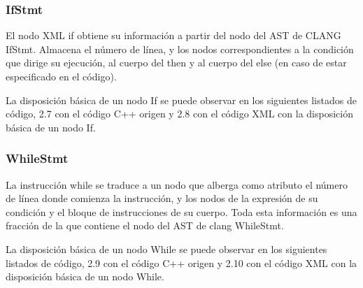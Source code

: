 \subsubsection*{IfStmt}

El nodo XML if obtiene su informaci\'on a partir del nodo del AST de CLANG IfStmt. Almacena el n\'umero de l\'inea, y los nodos correspondientes a la condici\'on que dirige su ejecuci\'on, al cuerpo del then y al cuerpo del else (en caso de estar especificado en el c\'odigo).

La disposici\'on b\'asica de un nodo If se puede observar en los siguientes listados de c\'odigo, 2.7 con el c\'odigo C++ origen y 2.8 con el c\'odigo XML con la disposici\'on b\'asica de un nodo If.




\subsubsection*{WhileStmt}

La instrucci\'on while se traduce a un nodo que alberga como atributo el n\'umero de l\'inea donde comienza la instrucci\'on, y los nodos de la expresi\'on de su condici\'on y el bloque de instrucciones de su cuerpo. Toda esta informaci\'on es una fracci\'on de la que contiene el nodo del AST de clang WhileStmt.

La disposici\'on b\'asica de un nodo While se puede observar en los siguientes listados de c\'odigo, 2.9 con el c\'odigo C++ origen y 2.10 con el c\'odigo XML con la disposici\'on b\'asica de un nodo While.





